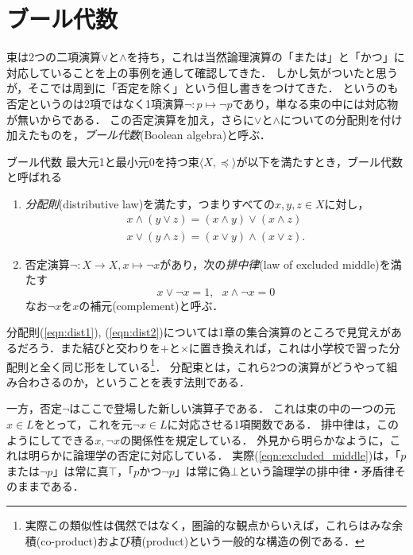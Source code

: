 \documentclass[11pt,a4paper, dvipdfmx]{jsarticle}
\begin{document}


\section{ブール代数}

束は2つの二項演算$\vee$と$\wedge$を持ち，これは当然論理演算の「または」と「かつ」に対応していることを上の事例を通して確認してきた．
しかし気がついたと思うが，そこでは周到に「否定を除く」という但し書きをつけてきた．
というのも否定というのは2項ではなく1項演算$\neg:p \mapsto \neg p$であり，単なる束の中には対応物が無いからである．
この否定演算を加え，さらに$\vee$と$\wedge$についての分配則を付け加えたものを，\emph{ブール代数}(Boolean algebra)と呼ぶ．

\begin{itembox}[l]{ブール代数}
    最大元1と最小元0を持つ束$\langle X, \preceq \rangle$が以下を満たすとき，ブール代数と呼ばれる
    \begin{enumerate}
        \item \emph{分配則}(distributive law)を満たす，つまりすべての$x, y, z \in X$に対し，
        \begin{align}
         x \wedge (y \vee z) = (x \wedge y) \vee (x \wedge z) \label{eqn:dist1}\\
         x \vee (y \wedge z) = (x \vee y) \wedge (x \vee z) . \label{eqn:dist2}
        \end{align}
        \item 否定演算$\neg: X \to X, x \mapsto \neg x$があり，次の\emph{排中律}(law of excluded middle)を満たす
        \begin{equation}
            x \vee \neg x = 1, \ \ \ x \wedge \neg x = 0
           \label{eqn:excluded_middle}
        \end{equation}
        なお$\neg x$を$x$の補元(complement)と呼ぶ．
    \end{enumerate}   
\end{itembox}

分配則(\ref{eqn:dist1}), (\ref{eqn:dist2})については1章の集合演算のところで見覚えがあるだろう．また結びと交わりを$+$と$\times$に置き換えれば，これは小学校で習った分配則と全く同じ形をしている\footnote{実際この類似性は偶然ではなく，圏論的な観点からいえば，これらはみな余積(co-product)および積(product)という一般的な構造の例である．}．
分配束とは，これら2つの演算がどうやって組み合わさるのか，ということを表す法則である．

一方，否定$\neg$はここで登場した新しい演算子である．
これは束の中の一つの元$x \in L$をとって，これを元$\neg x \in L$に対応させる1項関数である．
排中律は，このようにしてできる$x, \neg x$の関係性を規定している．
外見から明らかなように，これは明らかに論理学の否定に対応している．
実際(\ref{eqn:excluded_middle})は，「$p$または$\neg p$」は常に真$\top$，「$p$かつ$\neg p$」は常に偽$\bot$という論理学の排中律・矛盾律そのままである．
\end{document}
